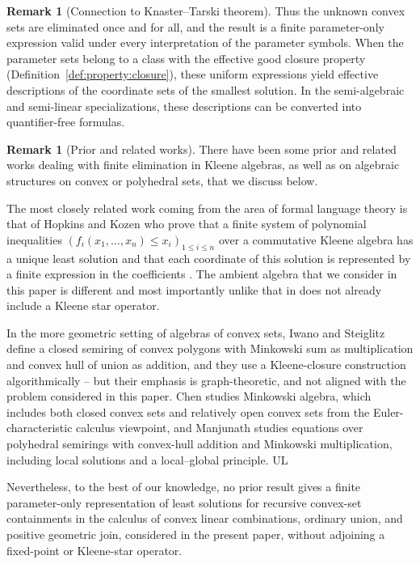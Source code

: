 \documentclass[10pt]{amsart}
\theoremstyle{plain}
\theoremstyle{definition}
\newtheorem{remark}[lemma]{Remark}
\let\leq\leqslant
\begin{document}
\begin{remark}[Connection to Knaster--Tarski theorem]
Thus the unknown convex sets are eliminated once and for all, and the
result is a finite parameter-only expression valid under every
interpretation of the parameter symbols. 
When the parameter sets belong to a class with the effective good
closure property (Definition~\ref{def:property:closure}), these uniform expressions yield effective descriptions
of the coordinate sets of the smallest solution. In the semi-algebraic
and semi-linear specializations, these descriptions can be converted
into quantifier-free formulas.
\end{remark}

\begin{remark}[Prior and related works]
\label{rem:prior}
There have been some prior and related works dealing with
finite elimination in Kleene algebras, as well as on algebraic structures on convex or polyhedral sets, that we discuss below.

The most closely related work coming from the area of formal language theory is that
of Hopkins and Kozen \cite{HK99} who prove that a finite system of polynomial inequalities
$\left(f_i(x_1,\ldots,x_n) \leq x_i\right)_{1 \leq i \leq n}$
over a commutative Kleene algebra has a unique least solution and that each coordinate of this
solution is represented by a finite expression in the coefficients \cite[Theorem 1.1, p. 394]{HK99}.  The ambient algebra that we consider in this paper is different and most importantly unlike that in \cite{HK99} does not already include a Kleene star operator. 

In the more geometric setting of algebras of convex sets, 
Iwano and Steiglitz \cite{IS90}  define a closed semiring of convex polygons with Minkowski sum as multiplication
and convex hull of union as addition, and they use a Kleene-closure construction algorithmically --  but their emphasis is graph-theoretic, and not aligned with the problem considered in this paper.
Chen \cite{Chen99}
studies Minkowski algebra, which includes both closed convex sets and relatively open convex sets from the Euler-characteristic calculus viewpoint, and
Manjunath \cite{Manjunath2024} studies equations over polyhedral semirings
with convex-hull addition and Minkowski multiplication, including local solutions and a local–global principle. UL

Nevertheless, to the best of our knowledge, no prior result gives a finite parameter-only representation
of least solutions for recursive convex-set containments in the calculus of convex
linear combinations, ordinary union, and positive geometric join,
considered in the present paper,
without adjoining a fixed-point or Kleene-star operator.  
\end{remark}
\end{document}
